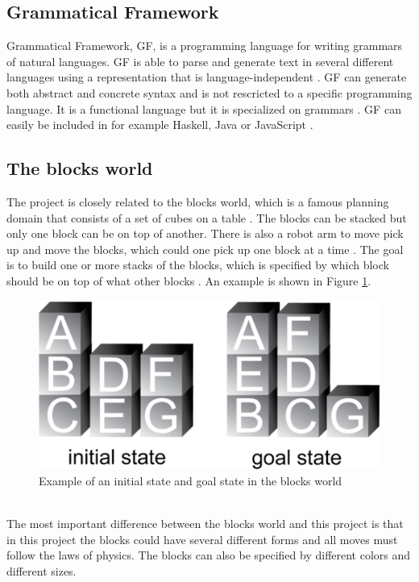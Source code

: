 \subsection{Grammatical Framework}
Grammatical Framework, GF, is a programming language for writing grammars of natural languages. GF is able to parse and generate text in several different languages using a representation that is language-independent \citep{gf_url}. GF can generate both abstract and concrete syntax and is not rescricted to a specific programming language. It is a functional language but it is specialized on grammars \citep{gf_url}. 
GF can easily be included in for example Haskell, Java or JavaScript \citep{gf_url}.

\subsection{The blocks world}
The project is closely related to the blocks world, which is a famous planning domain that consists of a set of cubes on a table \citep{blocksworld_ai}. The blocks can be stacked but only one block can be on top of another. There is also a robot arm to move pick up and move the blocks, which could one pick up one block at a time \citep{blocksworld_ai}. The goal is to build one or more stacks of the blocks, which is specified by which block should be on top of what other blocks \citep{blocksworld_ai}. An example is shown in Figure \ref{fig:blocksworld}.
\begin{figure}[h!]
\centering
\includegraphics[scale = 0.4]{fig/blocksworld.png}
\caption{Example of an initial state and goal state in the blocks world \citep{blocksworld_fig}}
\label{fig:blocksworld}
\end{figure}\\
The most important difference between the blocks world and this project is that in this project the blocks could have several different forms and all moves must follow the laws of physics. The blocks can also be specified by different colors and different sizes.  

